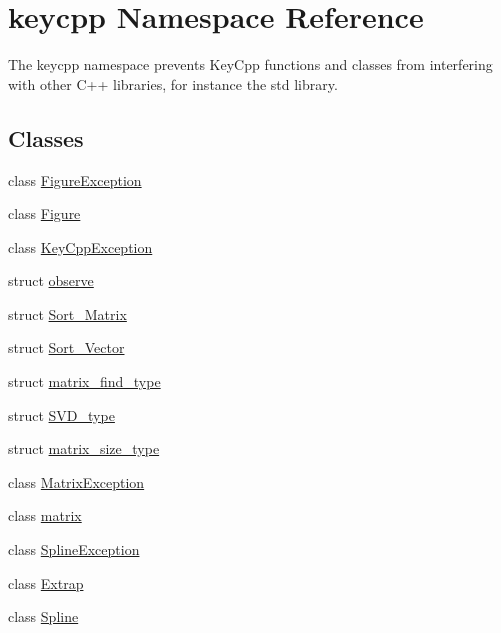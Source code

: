 \hypertarget{namespacekeycpp}{\section{keycpp Namespace Reference}
\label{namespacekeycpp}
}


The keycpp namespace prevents Key\-Cpp functions and classes from interfering with other C++ libraries, for instance the std library.  


\subsection*{Classes}
\begin{DoxyCompactItemize}
\item 
class \hyperlink{classkeycpp_1_1_figure_exception}{Figure\-Exception}
\item 
class \hyperlink{classkeycpp_1_1_figure}{Figure}
\item 
class \hyperlink{classkeycpp_1_1_key_cpp_exception}{Key\-Cpp\-Exception}
\item 
struct \hyperlink{structkeycpp_1_1observe}{observe}
\item 
struct \hyperlink{structkeycpp_1_1_sort___matrix}{Sort\-\_\-\-Matrix}
\item 
struct \hyperlink{structkeycpp_1_1_sort___vector}{Sort\-\_\-\-Vector}
\item 
struct \hyperlink{structkeycpp_1_1matrix__find__type}{matrix\-\_\-find\-\_\-type}
\item 
struct \hyperlink{structkeycpp_1_1_s_v_d__type}{S\-V\-D\-\_\-type}
\item 
struct \hyperlink{structkeycpp_1_1matrix__size__type}{matrix\-\_\-size\-\_\-type}
\item 
class \hyperlink{classkeycpp_1_1_matrix_exception}{Matrix\-Exception}
\item 
class \hyperlink{classkeycpp_1_1matrix}{matrix}
\item 
class \hyperlink{classkeycpp_1_1_spline_exception}{Spline\-Exception}
\item 
class \hyperlink{classkeycpp_1_1_extrap}{Extrap}
\item 
class \hyperlink{classkeycpp_1_1_spline}{Spline}
\end{DoxyCompactItemize}
